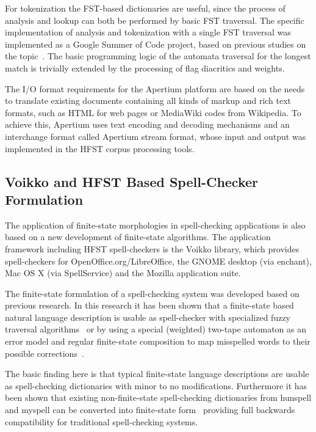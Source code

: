 \documentclass{llncs}
\begin{document}
For tokenization the FST-based dictionaries are useful, since the process of
analysis and lookup can both be performed by basic FST traversal. The specific
implementation of analysis and tokenization with a single FST traversal was
implemented as a Google Summer of Code project, based on previous studies on
the topic~\cite{garrido-alenda/2002}. The basic programming logic of the automata traversal
for the longest match is trivially extended by the processing of flag diacritics
and weights.

The I/O format requirements for the Apertium platform are based on the needs to
translate existing documents containing all kinds of markup and rich text
formats, such as HTML for web pages or MediaWiki codes from Wikipedia. To
achieve this, Apertium uses text encoding and decoding mechanisms and
an interchange format called Apertium stream format, whose input and output
was implemented in the HFST corpus processing tools.

\subsection{Voikko and HFST Based Spell-Checker Formulation}\label{spellcheck}
The application of finite-state morphologies in spell-checking applications
is also based on a new development of finite-state algorithms. The application
framework including HFST spell-checkers is the Voikko library, which provides
spell-checkers for OpenOffice.org/LibreOffice, the GNOME desktop (via
enchant), Mac OS X (via SpellService) and the Mozilla application suite.

The finite-state formulation of a spell-checking system was developed based on
previous research. In this research it has been shown that a finite-state based
natural language description is usable as spell-checker with specialized fuzzy
traversal algorithms~\cite{oflazer/1996,hulden/2009} or by using a special
(weighted) two-tape automaton as an error model and regular finite-state
composition to map misspelled words to their possible
corrections~\cite{agata/2002,pirinen/2010/lrec}.
 
The basic finding here is that typical finite-state language descriptions are
usable as spell-checking dictionaries with minor to no modifications.
Furthermore it has been shown that existing non-finite-state spell-checking
dictionaries from hunspell and myspell can be converted into finite-state
form~\cite{pirinen/2010/cla} providing full backwards compatibility for
traditional spell-checking systems.
\end{document}
